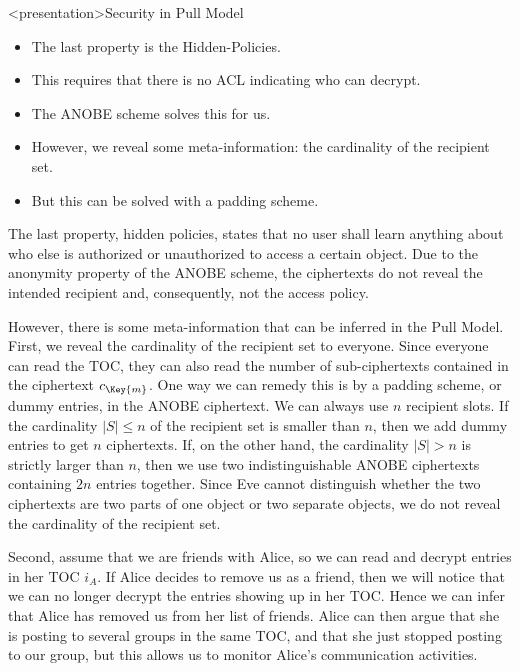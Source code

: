 \begin{frame}<presentation>{Security in Pull Model}
  \begin{itemize}

    \item The last property is the Hidden-Policies.
      
    \item This requires that there is no \ac{ACL} indicating who can decrypt.

    \item The \ac{ANOBE} scheme solves this for us.

      \pause{}

    \item However, we reveal some meta-information: the cardinality of the 
      recipient set.

    \item But this can be solved with a padding scheme.

  \end{itemize}
\end{frame}

The last property, hidden policies, states that no user shall learn anything 
about who else is authorized or unauthorized to access a certain object.
Due to the anonymity property of the \ac{ANOBE} scheme, the ciphertexts do not 
reveal the intended recipient and, consequently, not the access policy.

However, there is some meta-information that can be inferred in the Pull Model.
First, we reveal the cardinality of the recipient set to everyone.
Since everyone can read the \ac{TOC}, they can also read the number of 
sub-ciphertexts contained in the ciphertext \(c_{\Key{m}}\).
One way we can remedy this is by a padding scheme, or dummy entries, in the 
\ac{ANOBE} ciphertext.
We can always use \(n\) recipient slots.
If the cardinality \(|S|\leq n\) of the recipient set is smaller than \(n\), 
then we add dummy entries to get \(n\) ciphertexts.
If, on the other hand, the cardinality \(|S| > n\) is strictly larger than 
\(n\), then we use two indistinguishable \ac{ANOBE} ciphertexts containing 
\(2n\) entries together.
Since Eve cannot distinguish whether the two ciphertexts are two parts of one 
object or two separate objects, we do not reveal the cardinality of the 
recipient set.

Second, assume that we are friends with Alice, so we can read and decrypt 
entries in her \ac{TOC} \(i_A\).
If Alice decides to remove us as a friend, then we will notice that we can no 
longer decrypt the entries showing up in her \ac{TOC}.
Hence we can infer that Alice has removed us from her list of friends.
Alice can then argue that she is posting to several groups in the same 
\ac{TOC}, and that she just stopped posting to our group, but this allows us to 
monitor Alice's communication activities.

